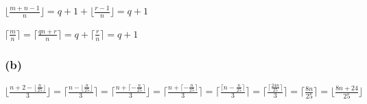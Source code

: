 \documentclass{article}
\begin{document}
\( \lfloor{\frac{m+n-1}{n}}\rfloor = q + 1 + \lfloor{\frac{r-1}{n}}\rfloor = q + 1 \)

\( \lceil{\frac{m}{n}}\rceil = \lceil{\frac{qn+r}{n}}\rceil = q + \lceil{\frac{r}{n}}\rceil = q + 1 \)

\subsubsection*{(b)}

\( \lfloor{\frac{n+2 - \lfloor{\frac{n}{25}}\rfloor}{3}}\rfloor = \lceil{\frac{n - \lfloor{\frac{n}{25}}\rfloor}{3}}\rceil = \lceil{\frac{n + \lceil{-\frac{n}{25}}\rceil}{3}}\rfloor = \lceil{\frac{n + \lceil{-\frac{n}{25}}\rceil}{3}}\rceil = \lceil{\frac{\lceil{n-\frac{n}{25}}\rceil}{3}}\rceil = \lceil{\frac{\lceil{\frac{24n}{25}}\rceil}{3}}\rceil = \lceil{\frac{8n}{25}}\rceil = \lfloor{\frac{8n+24}{25}}\rfloor \)
\end{document}
